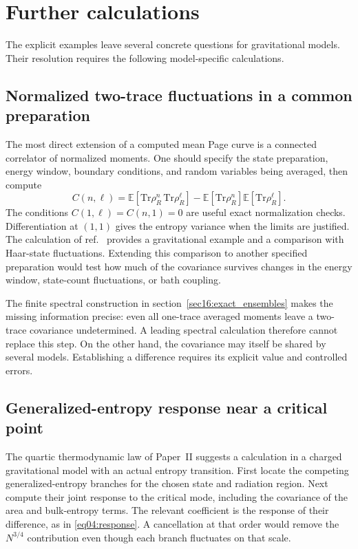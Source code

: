 \documentclass[11pt,letterpaper]{article}
\theoremstyle{plain}
\theoremstyle{definition}
\theoremstyle{remark}
\newcommand{\E}{\mathbb{E}}
\begin{document}
\section{Further calculations}
\label{sec09:research_program}

The explicit examples leave several concrete questions for gravitational
models. Their resolution requires the following model-specific
calculations.

\subsection{Normalized two-trace fluctuations in a common preparation}

The most direct extension of a computed mean Page curve is a connected
correlator of normalized moments. One should specify the state
preparation, energy window, boundary conditions, and random variables
being averaged, then compute
\begin{equation}
 C(n,\ell)=\E[\mathrm{Tr}\rho_R^n\,\mathrm{Tr}\rho_R^\ell]
       -\E[\mathrm{Tr}\rho_R^n]\E[\mathrm{Tr}\rho_R^\ell].
 \label{eq09:covariance_target}
\end{equation}
The conditions $C(1,\ell)=C(n,1)=0$ are useful exact normalization
checks. Differentiation at $(1,1)$ gives the entropy variance when the
limits are justified. The calculation of ref.~\cite{boussomiyaji2024}
provides a gravitational example and a comparison with Haar-state
fluctuations. Extending this comparison to another specified
preparation would test how much of the covariance survives changes in
the energy window, state-count fluctuations, or bath coupling.

The finite spectral construction in
section~\ref{sec16:exact_ensembles} makes the missing information
precise: even all one-trace averaged moments leave a two-trace
covariance undetermined. A leading spectral calculation therefore
cannot replace this step. On the other hand, the covariance may itself
be shared by several models. Establishing a difference requires its
explicit value and controlled errors.

\subsection{Generalized-entropy response near a critical point}

The quartic thermodynamic law of Paper~II suggests a calculation in a
charged gravitational model with an actual entropy transition. First
locate the competing generalized-entropy branches for the chosen state
and radiation region. Next compute their joint response to the critical
mode, including the covariance of the area and bulk-entropy terms.
The relevant coefficient is the response of their difference, as in
\eqref{eq04:response}. A cancellation at that order would remove the
$N^{3/4}$ contribution even though each branch fluctuates on that scale.
\end{document}
